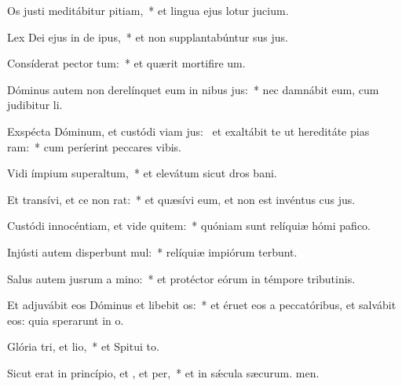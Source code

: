\item Os justi meditábitur pitiam,~* et lingua ejus lotur jucium.
\item Lex Dei ejus in de ipus,~* et non supplantabúntur sus jus.
\item Consíderat pector tum:~* et quærit mortifire um.
\item Dóminus autem non derelínquet eum in nibus jus:~* nec damnábit eum, cum judibitur li.
\item Exspécta Dóminum, et custódi viam jus:~\pscross{} et exaltábit te ut hereditáte pias ram:~* cum períerint peccares vibis.
\item Vidi ímpium superaltum,~* et elevátum sicut dros bani.
\item Et transívi, et ce non rat:~* et quæsívi eum, et non est invéntus cus jus.
\item Custódi innocéntiam, et vide quitem:~* quóniam sunt relíquiæ hómi pafico.
\item Injústi autem disperbunt mul:~* relíquiæ impiórum terbunt.
\item Salus autem jusrum a mino:~* et protéctor eórum in témpore tributinis.
\item Et adjuvábit eos Dóminus et libebit os:~* et éruet eos a peccatóribus, et salvábit eos: quia sperarunt in o.
\item Glória tri, et lio,~* et Spitui to.
\item Sicut erat in princípio, et , et per,~* et in sǽcula sæcurum. men.
